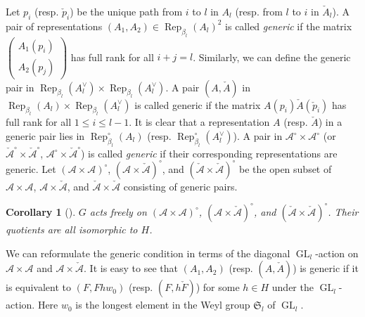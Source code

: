 \documentclass{amsart}
\newtheorem{lemma}[theorem]{Lemma}
\newtheorem{corollary}[theorem]{Corollary}
\theoremstyle{definition}
\theoremstyle{remark}
\numberwithin{equation}{section}
\DeclareMathOperator{\A}{A}
\DeclareMathOperator{\GL}{GL}
\DeclareMathOperator{\Rep}{Rep}
\newcommand{\mc}[1]{\mathcal{#1}}
\newcommand{\mf}[1]{\mathfrak{#1}}
\newcommand{\mch}[1]{\check{\mathcal{#1}}}
\newcommand{\sm}[1]{{\left(\begin{smallmatrix}#1\end{smallmatrix}\right)}}
\newcommand{\bl}{{\beta_l}}
\begin{document}
Let $p_i$ (resp. $\check{p}_i$) be the unique path from $i$ to $l$ in $A_l$ (resp. from $l$ to $i$ in $\check{A}_l$).
A pair of representations $(A_1,A_2)\in \Rep_{\bl}(A_l)^2$ is called {\em generic} if the matrix $\sm{A_1(p_i)\\A_2(p_j)}$ has full rank for all $i+j=l$.
Similarly, we can define the generic pair in $\Rep_{\bl}(A_l^\vee)\times \Rep_{\bl}(A_l^\vee)$.
A pair $(A,\check{A})$ in $\Rep_{\bl}(A_l)\times \Rep_{\bl}(A_l^\vee)$ is called {generic} if the matrix $A(p_i)\check{A}(\check{p}_i)$ has full rank for all $1\leq i\leq l-1$.
It is clear that a representation $A$ (resp. $\check{A}$) in a generic pair lies in $\Rep_{\bl}^\circ(A_l)$ (resp. $\Rep_{\bl}^\circ(A_l^\vee)$).
A pair in $\mc{A}^\circ\times \mc{A}^\circ$ (or $\mch{A}^\circ\times \mch{A}^\circ$, $\mc{A}^\circ\times \mch{A}^\circ$) is called {\em generic} if their corresponding representations are generic.
Let $(\mc{A}\times\mc{A})^\circ$, $(\mc{A}\times\mch{A})^\circ$, and $(\mch{A}\times\mch{A})^\circ$ be the open subset of $\mc{A}\times\mc{A}$, $\mc{A}\times\mch{A}$, and $\mch{A}\times\mch{A}$ consisting of generic pairs.

\begin{corollary}[{\cite[Corollary 4.6]{FW}}] \label{C:doubleflag} $G$ acts freely on $(\mc{A}\times\mc{A})^\circ$, $(\mc{A}\times\mch{A})^\circ$, and $(\mch{A}\times\mch{A})^\circ$. Their quotients are all isomorphic to $H$.
\end{corollary}


We can reformulate the generic condition in terms of the diagonal $\GL_l$-action on $\mc{A}\times {\mc{A}}$ and $\mc{A}\times \mch{A}$.
It is easy to see that $(A_1,A_2)$ (resp. $(A,\check{A})$) is generic if it is equivalent to $(F, Fhw_0)$ (resp. $(F, h\check{F})$) for some $h\in H$ under the $\GL_l$-action. 
Here $w_0$ is the longest element in the Weyl group $\mf{S}_l$ of $\GL_l$.
\end{document}
